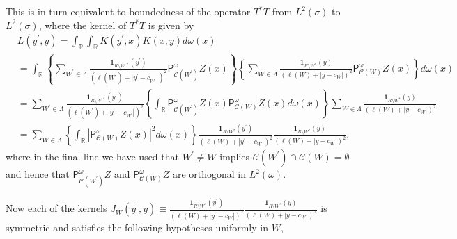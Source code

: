 \documentclass{amsart}%
\theoremstyle{plain}
\numberwithin{equation}{section}
\begin{document}
This is in turn equivalent to boundedness of the operator $T^{\ast}T$ from
$L^{2}\left(  \sigma\right)  $ to $L^{2}\left(  \sigma\right)  $, where the
kernel of $T^{\ast}T$ is given by%
\begin{align*}
& L\left(  y^{\prime},y\right)  =\int_{\mathbb{R}}\int_{\mathbb{R}}K\left(
y^{\prime},x\right)  K\left(  x,y\right)  d\omega\left(  x\right) \\
& =\int_{\mathbb{R}}\left\{  \sum_{W^{\prime}\in\Lambda}\frac{\mathbf{1}%
_{R\setminus W^{\prime\ast}}\left(  y^{\prime}\right)  }{\left(  \ell\left(
W^{\prime}\right)  +\left\vert y^{\prime}-c_{W^{\prime}}\right\vert \right)
^{2}}\mathsf{P}_{\mathcal{C}\left(  W^{\prime}\right)  }^{\omega}Z\left(
x\right)  \right\}  \left\{  \sum_{W\in\Lambda}\frac{\mathbf{1}_{R\setminus
W^{\ast}}\left(  y\right)  }{\left(  \ell\left(  W\right)  +\left\vert
y-c_{W}\right\vert \right)  ^{2}}\mathsf{P}_{\mathcal{C}\left(  W\right)
}^{\omega}Z\left(  x\right)  \right\}  d\omega\left(  x\right) \\
& =\sum_{W^{\prime}\in\Lambda}\frac{\mathbf{1}_{R\setminus W^{\prime\ast}%
}\left(  y^{\prime}\right)  }{\left(  \ell\left(  W^{\prime}\right)
+\left\vert y^{\prime}-c_{W^{\prime}}\right\vert \right)  ^{2}}\left\{
\int_{\mathbb{R}}\mathsf{P}_{\mathcal{C}\left(  W^{\prime}\right)  }^{\omega
}Z\left(  x\right)  \mathsf{P}_{\mathcal{C}\left(  W\right)  }^{\omega
}Z\left(  x\right)  d\omega\left(  x\right)  \right\}  \sum_{W\in\Lambda}%
\frac{\mathbf{1}_{R\setminus W^{\ast}}\left(  y\right)  }{\left(  \ell\left(
W\right)  +\left\vert y-c_{W}\right\vert \right)  ^{2}}\\
& =\sum_{W\in\Lambda}\left\{  \int_{\mathbb{R}}\left\vert \mathsf{P}%
_{\mathcal{C}\left(  W\right)  }^{\omega}Z\left(  x\right)  \right\vert
^{2}d\omega\left(  x\right)  \right\}  \frac{\mathbf{1}_{R\setminus W^{\ast}%
}\left(  y^{\prime}\right)  }{\left(  \ell\left(  W\right)  +\left\vert
y^{\prime}-c_{W}\right\vert \right)  ^{2}}\frac{\mathbf{1}_{R\setminus
W^{\ast}}\left(  y\right)  }{\left(  \ell\left(  W\right)  +\left\vert
y-c_{W}\right\vert \right)  ^{2}},
\end{align*}
where in the final line we have used that $W^{\prime}\neq W$ implies
$\mathcal{C}\left(  W^{\prime}\right)  \cap\mathcal{C}\left(  W\right)
=\emptyset$ and hence that $\mathsf{P}_{\mathcal{C}\left(  W^{\prime}\right)
}^{\omega}Z$ and $\mathsf{P}_{\mathcal{C}\left(  W\right)  }^{\omega}Z$ are
orthogonal in $L^{2}\left(  \omega\right)  $.

Now each of the kernels $J_{W}\left(  y^{\prime},y\right)  \equiv
\frac{\mathbf{1}_{R\setminus W^{\ast}}\left(  y^{\prime}\right)  }{\left(
\ell\left(  W\right)  +\left\vert y^{\prime}-c_{W}\right\vert \right)  ^{2}%
}\frac{\mathbf{1}_{R\setminus W^{\ast}}\left(  y\right)  }{\left(  \ell\left(
W\right)  +\left\vert y-c_{W}\right\vert \right)  ^{2}}$ is symmetric and
satisfies the following hypotheses uniformly in $W$,
\end{document}
